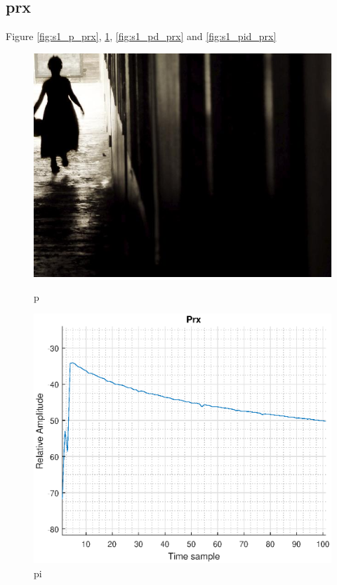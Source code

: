 \subsection{prx}
Figure \ref{fig:s1_p_prx}, \ref{fig:s1_pi_prx}, \ref{fig:s1_pd_prx} and \ref{fig:s1_pid_prx}
\begin{figure}[H]
\begin{minipage}[t]{0.45\textwidth}
\includegraphics[width=\linewidth]{figures/randomfigure.jpg}
\caption{p}
\label{fig:s1_p_prx}
\end{minipage}
\hspace{\fill}
\begin{minipage}[t]{0.45\textwidth}
\includegraphics[width=\linewidth]{figures/s1_pi_prx.eps}
\caption{pi}
\label{fig:s1_pi_prx}
\end{minipage}


\end{figure}
